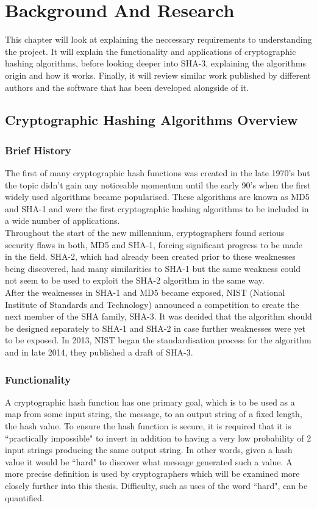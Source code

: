\chapter{Background And Research}
This chapter will look at explaining the neccessary requirements to understanding the project. It will explain the functionality and applications of cryptographic hashing algorithms, before looking deeper into SHA-3, explaining the algorithms origin and how it works. Finally, it will review similar work published by different authors and the software that has been developed alongside of it.
\section{Cryptographic Hashing Algorithms Overview}
\subsection{Brief History}
The first of many cryptographic hash functions was created in the late 1970's but the topic didn't gain any noticeable momentum until the early 90's when the first widely used algorithms became popularised. These algorithms are known as MD5 and SHA-1 and were the first cryptographic hashing algorithms to be included in a wide number of applications.
\vspace{5 mm}\\
Throughout the start of the new millennium, cryptographers found serious security flaws in both, MD5 and SHA-1, forcing significant progress to be made in the field. SHA-2, which had already been created prior to these weaknesses being discovered, had many similarities to SHA-1 but the same weakness could not seem to be used to exploit the SHA-2 algorithm in the same way. \vspace{5 mm}\\
After the weaknesses in SHA-1 and MD5 became exposed, NIST (National Institute of Standards and Technology) announced a competition to create the next member of the SHA family, SHA-3. It was decided that the algorithm should be designed separately to SHA-1 and SHA-2 in case further weaknesses were yet to be exposed. In 2013, NIST began the standardisation process for the algorithm and in late 2014, they published a draft of SHA-3.\cite{SHA3comp}
\subsection{Functionality}
A cryptographic hash function has one primary goal, which is to be used as a map from some input string, the message, to an output string of a fixed length, the hash value. To ensure the hash function is secure, it is required that it is ``practically impossible" to invert in addition to having a very low probability of 2 input strings producing the same output string. In other words, given a hash value it would be ``hard" to discover what message generated such a value.  A more precise definition is used by cryptographers which will be examined more closely further into this thesis. Difficulty, such as uses of the word ``hard", can be quantified.
